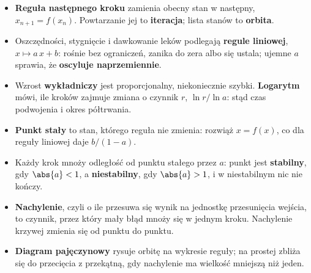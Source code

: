 \begin{summarybox}[unbreakable]
\begin{itemize}
\item \textbf{Reguła następnego kroku} zamienia obecny stan w następny,
  $x_{n+1} = f(x_n)$. Powtarzanie jej to \textbf{iteracja}; lista stanów to
  \textbf{orbita}.
\item Oszczędności, stygnięcie i dawkowanie leków podlegają
  \textbf{regule liniowej}, $x \mapsto a\,x + b$: rośnie bez ograniczeń,
  zanika do zera albo się ustala; ujemne $a$ sprawia, że
  \textbf{oscyluje naprzemiennie}.
\item Wzrost \textbf{wykładniczy} jest proporcjonalny, niekoniecznie
  szybki. \textbf{Logarytm} mówi, ile kroków zajmuje zmiana o czynnik $r$,
  $\ln r / \ln a$: stąd czas podwojenia i okres półtrwania.
\item \textbf{Punkt stały} to stan, którego reguła nie zmienia: rozwiąż
  $x = f(x)$, co dla reguły liniowej daje $b/(1 - a)$.
\item Każdy krok mnoży odległość od punktu stałego przez $a$: punkt jest
  \textbf{stabilny}, gdy $\abs{a} < 1$, a \textbf{niestabilny}, gdy
  $\abs{a} > 1$, i w niestabilnym nic nie kończy.
\item \textbf{Nachylenie}, czyli o ile przesuwa się wynik na jednostkę
  przesunięcia wejścia, to czynnik, przez który mały błąd mnoży się w
  jednym kroku. Nachylenie krzywej zmienia się od punktu do punktu.
\item \textbf{Diagram pajęczynowy} rysuje orbitę na wykresie reguły; na
  prostej zbliża się do przecięcia z przekątną, gdy nachylenie ma wielkość
  mniejszą niż jeden.
\end{itemize}
\end{summarybox}

\canyou

